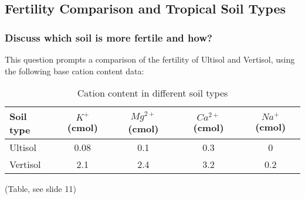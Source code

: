 \subsection{Fertility Comparison and Tropical Soil Types} \subsubsection{Discuss which soil is more fertile and how?} This question prompts a comparison of the fertility of Ultisol and Vertisol, using the following base cation content data:
\begin{table}[h]
    \centering
    \caption{Cation content in different soil types}
    \label{tab:soil_cations}
    \begin{tabular}{ l | c | c | c | c }
        \textbf{Soil type} & \textbf{$K^+$} (cmol) & \textbf{$Mg^{2+}$} (cmol) & \textbf{$Ca^{2+}$} (cmol) & \textbf{$Na^+$} (cmol) \\ 
        \hline
        Ultisol  & 0.08 & 0.1 & 0.3 & 0   \\
        Vertisol & 2.1  & 2.4 & 3.2 & 0.2 \\
    \end{tabular}
\end{table}

(Table, see slide 11) 

